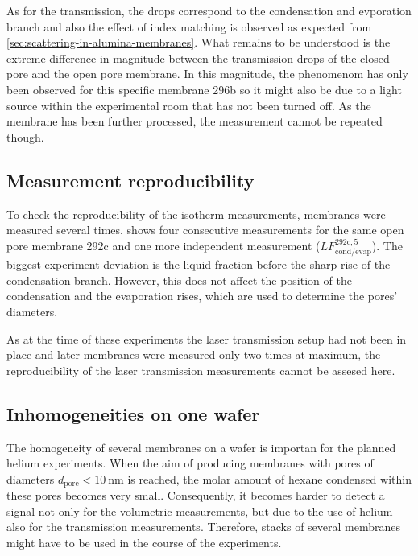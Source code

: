 \documentclass[../thesis.tex]{subfiles}
\begin{document}
        As for the transmission, the drops correspond to the condensation and evporation branch and also the effect of index matching is observed as expected from \cref{sec:scattering-in-alumina-membranes}. What remains to be understood is the extreme difference in magnitude between the transmission drops of the closed pore and the open pore membrane. In this magnitude, the phenomenom has only been observed for this specific membrane 296b so it might also be due to a light source within the experimental room that has not been turned off. As the membrane has been further processed, the measurement cannot be repeated though.


    \subsection{Measurement reproducibility}
    \label{subsec:measurement-reproducibility}

        

        To check the reproducibility of the isotherm measurements, membranes were measured several times.  shows four consecutive measurements for the same open pore membrane 292c and one more independent measurement ($LF_\mathrm{cond/evap}^\mathrm{292c,5}$). The biggest experiment deviation is the liquid fraction before the sharp rise of the condensation branch. However, this does not affect the position of the condensation and the evaporation rises, which are used to determine the pores' diameters.
        \medskip

        As at the time of these experiments the laser transmission setup had not been in place and later membranes were measured only two times at maximum, the reproducibility of the laser transmission measurements cannot be assesed here.


    \subsection{Inhomogeneities on one wafer}
    \label{subsec:wafer-inhomogeneities}

        
        

        The homogeneity of several membranes on a wafer is importan for the planned helium experiments. When the aim of producing membranes with pores of diameters $d_\mathrm{pore}<\SI{10}{\nano\meter}$ is reached, the molar amount of hexane condensed within these pores becomes very small. Consequently, it becomes harder to detect a signal not only for the volumetric measurements, but due to the use of helium also for the transmission measurements. Therefore, stacks of several membranes might have to be used in the course of the experiments.
        \medskip
\end{document}
